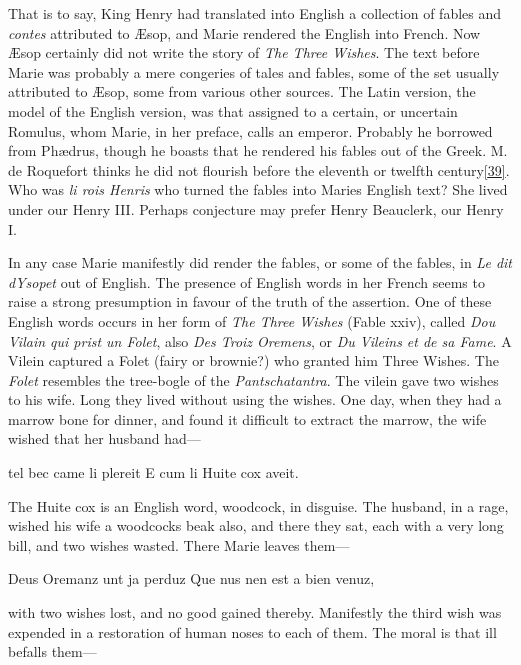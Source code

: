 \documentclass[14pt,a4paper]{memoir}
\begin{document}
That is to say, King Henry had translated into English a collection of
fables and \emph{contes} attributed to Æsop, and Marie rendered the
English into French. Now Æsop certainly did not write the story of
\emph{The Three Wishes}. The text before Marie was probably a mere
congeries of tales and fables, some of the set usually attributed to
Æsop, some from various other sources. The Latin version, the model of
the English version, was that assigned to a certain, or uncertain
Romulus, whom Marie, in her preface, calls an emperor. Probably he
borrowed from Phædrus, though he boasts that he rendered his fables out
of the Greek. M. de Roquefort thinks he did not flourish before the
eleventh or twelfth
century\protect\hypertarget{4533318093929944247_33931-h-0.htm.xhtmlux5cux23FNanchor_39}{}{}\protect\hyperlink{4533318093929944247_33931-h-0.htm.xhtmlux5cux23Footnote_39}{{[}39{]}}.
Who was \emph{li rois Henris} who turned the fables into
Marie\textquotesingle s English text? She lived under our Henry III.
Perhaps conjecture may prefer Henry Beauclerk, our Henry I.

In any case Marie manifestly did render the fables, or some of the
fables, in \emph{Le dit d\textquotesingle Ysopet} out of English. The
presence of English words in her French seems to raise a strong
presumption in favour of the truth of the assertion. One of these
English words occurs in her form of \emph{The Three Wishes} (Fable
xxiv), called \emph{Dou Vilain qui prist un Folet}, also \emph{Des Troiz
Oremens}, or \emph{Du Vileins et de sa Fame}. A Vilein captured a Folet
(fairy or brownie?) who granted him Three Wishes. The \emph{Folet}
resembles the tree-bogle of the \emph{Pantschatantra}. The vilein gave
two wishes to his wife. Long they lived without using the wishes. One
day, when they had a marrow bone for dinner, and found it difficult to
extract the marrow, the wife wished that her husband had---

{\textquotesingle tel bec came li plereit} {E cum li Huite cox
aveit.\textquotesingle{}}

The Huite cox is an English word, woodcock, in disguise. The husband, in
a rage, wished his wife a woodcock\textquotesingle s beak also, and
there they sat, each with a very long bill, and two wishes wasted. There
Marie leaves them---

{\textquotesingle Deus Oremanz unt ja perduz} {Que nus
n\textquotesingle en est a bien venuz,\textquotesingle{}}

\textquotesingle with two wishes lost, and no good gained
thereby.\textquotesingle{} Manifestly the third wish was expended in a
restoration of human noses to each of them. The moral is that ill
befalls them---
\end{document}
